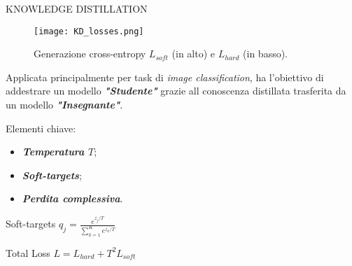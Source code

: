 \begin{frame}{KNOWLEDGE DISTILLATION}
    \begin{figure}
        \centering
        \texttt{[image: KD\_losses.png]}
        \centering
        \caption{Generazione cross-entropy $L_{soft}$ (in alto) e $L_{hard}$ (in basso).}
        \label{l_hard_soft}
    \end{figure}
    \vspace{-0.3cm}
     Applicata principalmente per task di \emph{image classification}, ha l'obiettivo di addestrare un modello {\bfseries{\emph{"Studente"}}} grazie all conoscenza distillata trasferita da un modello {\bfseries{\emph{"Insegnante"}}}.
     \begin{minipage}{\linewidth}
        \centering
        \begin{minipage}{0.45\linewidth}
            Elementi chiave:
            \begin{itemize}
                \item {\bfseries{\emph{Temperatura $T$}}};
                \item {\bfseries{\emph{Soft-targets}}};
                \item {\bfseries{\emph{Perdita complessiva}}}.
            \end{itemize}
        \end{minipage}
        \begin{minipage}{0.40\linewidth}
            \begin{block}{\centering Soft-targets}
                \centering
                $ q_j = \frac{e^{z_j/T}}{\sum_{k=1}^K e^{z_k/T}} $
            \end{block} 
            \begin{block}{\centering Total Loss}
                \centering \small $ L= L_{hard}+T^2L_{soft} $
            \end{block}
        \end{minipage}
    \end{minipage}
\end{frame}